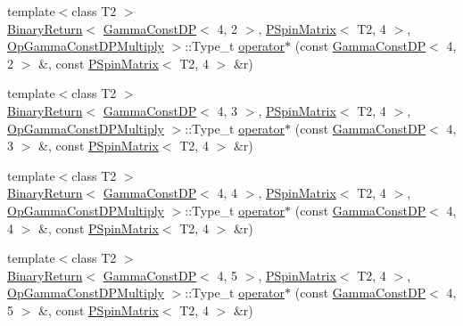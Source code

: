 \begin{DoxyCompactItemize}
\item 
{\footnotesize template$<$class T2 $>$ }\\\mbox{\hyperlink{structENSEM_1_1BinaryReturn}{Binary\+Return}}$<$ \mbox{\hyperlink{classENSEM_1_1GammaConstDP}{Gamma\+Const\+DP}}$<$ 4, 2 $>$, \mbox{\hyperlink{classENSEM_1_1PSpinMatrix}{P\+Spin\+Matrix}}$<$ T2, 4 $>$, \mbox{\hyperlink{structENSEM_1_1OpGammaConstDPMultiply}{Op\+Gamma\+Const\+D\+P\+Multiply}} $>$\+::Type\+\_\+t \mbox{\hyperlink{group__primspinmatrix_gaa8e0559c55ac9cff30b9407943afea03}{operator$\ast$}} (const \mbox{\hyperlink{classENSEM_1_1GammaConstDP}{Gamma\+Const\+DP}}$<$ 4, 2 $>$ \&, const \mbox{\hyperlink{classENSEM_1_1PSpinMatrix}{P\+Spin\+Matrix}}$<$ T2, 4 $>$ \&r)
\item 
{\footnotesize template$<$class T2 $>$ }\\\mbox{\hyperlink{structENSEM_1_1BinaryReturn}{Binary\+Return}}$<$ \mbox{\hyperlink{classENSEM_1_1GammaConstDP}{Gamma\+Const\+DP}}$<$ 4, 3 $>$, \mbox{\hyperlink{classENSEM_1_1PSpinMatrix}{P\+Spin\+Matrix}}$<$ T2, 4 $>$, \mbox{\hyperlink{structENSEM_1_1OpGammaConstDPMultiply}{Op\+Gamma\+Const\+D\+P\+Multiply}} $>$\+::Type\+\_\+t \mbox{\hyperlink{group__primspinmatrix_gae21434001730b61b41c47db91f4a45ba}{operator$\ast$}} (const \mbox{\hyperlink{classENSEM_1_1GammaConstDP}{Gamma\+Const\+DP}}$<$ 4, 3 $>$ \&, const \mbox{\hyperlink{classENSEM_1_1PSpinMatrix}{P\+Spin\+Matrix}}$<$ T2, 4 $>$ \&r)
\item 
{\footnotesize template$<$class T2 $>$ }\\\mbox{\hyperlink{structENSEM_1_1BinaryReturn}{Binary\+Return}}$<$ \mbox{\hyperlink{classENSEM_1_1GammaConstDP}{Gamma\+Const\+DP}}$<$ 4, 4 $>$, \mbox{\hyperlink{classENSEM_1_1PSpinMatrix}{P\+Spin\+Matrix}}$<$ T2, 4 $>$, \mbox{\hyperlink{structENSEM_1_1OpGammaConstDPMultiply}{Op\+Gamma\+Const\+D\+P\+Multiply}} $>$\+::Type\+\_\+t \mbox{\hyperlink{group__primspinmatrix_ga5399e919ac66849bae0231bd88b07167}{operator$\ast$}} (const \mbox{\hyperlink{classENSEM_1_1GammaConstDP}{Gamma\+Const\+DP}}$<$ 4, 4 $>$ \&, const \mbox{\hyperlink{classENSEM_1_1PSpinMatrix}{P\+Spin\+Matrix}}$<$ T2, 4 $>$ \&r)
\item 
{\footnotesize template$<$class T2 $>$ }\\\mbox{\hyperlink{structENSEM_1_1BinaryReturn}{Binary\+Return}}$<$ \mbox{\hyperlink{classENSEM_1_1GammaConstDP}{Gamma\+Const\+DP}}$<$ 4, 5 $>$, \mbox{\hyperlink{classENSEM_1_1PSpinMatrix}{P\+Spin\+Matrix}}$<$ T2, 4 $>$, \mbox{\hyperlink{structENSEM_1_1OpGammaConstDPMultiply}{Op\+Gamma\+Const\+D\+P\+Multiply}} $>$\+::Type\+\_\+t \mbox{\hyperlink{group__primspinmatrix_ga236159edb8e3e69f1a1813261364b3b3}{operator$\ast$}} (const \mbox{\hyperlink{classENSEM_1_1GammaConstDP}{Gamma\+Const\+DP}}$<$ 4, 5 $>$ \&, const \mbox{\hyperlink{classENSEM_1_1PSpinMatrix}{P\+Spin\+Matrix}}$<$ T2, 4 $>$ \&r)

\end{DoxyCompactItemize}
